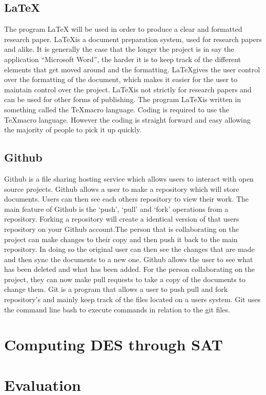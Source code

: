 \documentclass[11pt,a4paper]{report}
\begin{document}
\section{ \LaTeX}
The program LaTeX will be used in order to produce a clear and formatted research paper. \LaTeX\space is a document preparation system, used for research papers and alike. It is generally the case that the longer the project is in say the application “Microsoft Word”, the harder it is to keep track of the different elements that get moved around and the formatting. \LaTeX\space gives the user control over the formatting of the document, which makes it easier for the user to maintain control over the project. \LaTeX\space is not strictly for research papers and can be used for other forms of publishing. The program \LaTeX\space is written in something called the \TeX\space macro language. Coding is required to use the \TeX\space macro language. However the coding is straight forward and easy allowing the majority of people to pick it up quickly.  

\section{Github}
\label{sec:Git}
Github is a file sharing hosting service which allows users to interact with open source projects. Github allows a user to make a repository which will store documents. Users can then see each others repository to view their work. The main feature of Github is the `push', `pull' and `fork' operations from a repository. Forking a repository will create a identical version of that users repository on your Github account.The person that is collaborating on the project can make changes to their copy and then push it back to the main repository. In doing so the original user can then see the changes that are made and then sync the documents to a new one. Github allows the user to see what has been deleted and what has been added. For the person collaborating on the project, they can now make pull requests to take a copy of the documents to change them. 
Git is a program that allows a user to push pull and fork repository's and mainly keep track of the files located on a users system. Git uses the command line bash to execute commands in relation to the git files.


\chapter{Computing DES through SAT}
\label{cha:DESsat}

\chapter{Evaluation}
\label{cha:Eval}


\nocite{*}

\end{document}
